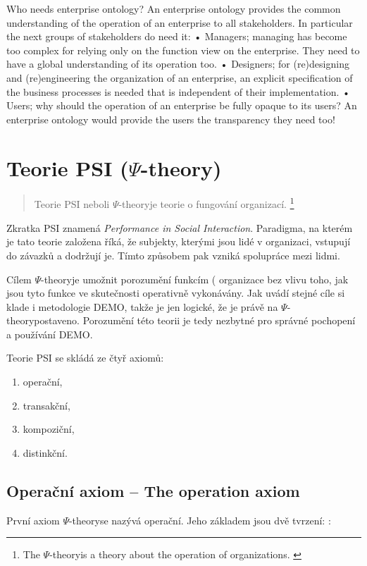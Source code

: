 \documentclass[]{article}
\newcommand{\ptheory}{$\Psi$-theory}
\begin{document}
Who needs enterprise ontology?
An enterprise ontology provides the common understanding of the operation of an enterprise to all stakeholders. In particular the next groups of stakeholders do need it:
• Managers; managing has become too complex for relying only on the function view on the enterprise. They need to have a global understanding of its operation too.
• Designers; for (re)designing and (re)engineering the organization of an enterprise, an explicit specification of the business processes is needed that is independent of their implementation.
• Users; why should the operation of an enterprise be fully opaque to its users? An enterprise ontology would provide the users the transparency they need too!

\section{Teorie PSI ($\Psi$-theory)}

\begin{quote}
Teorie PSI neboli \ptheory  je teorie o fungování organizací. \cite{Dietz2005}
\footnote{The \ptheory is a theory about the operation of organizations. \cite{Dietz2005}}
\end{quote}

Zkratka PSI znamená \textit{Performance in Social Interaction}. Paradigma, na kterém je tato teorie založena říká, že subjekty, kterými jsou lidé v organizaci, vstupují do závazků a dodržují je. Tímto způsobem pak vzniká spolupráce mezi lidmi. %

Cílem \ptheory je umožnit porozumění funkcím (%
organizace bez vlivu toho, jak jsou tyto funkce ve skutečnosti operativně vykonávány. Jak uvádí \cite{Vejrazkova2013} stejné cíle si klade i metodologie DEMO, takže je jen logické, že je právě na \ptheory postaveno. Porozumění této teorii je tedy nezbytné pro správné pochopení a používání DEMO.

Teorie PSI se skládá ze čtyř axiomů:

\begin{enumerate}
\item operační,
\item transakční,
\item kompoziční,
\item distinkční.
\end{enumerate}

\subsection{Operační axiom – The operation axiom}
První axiom \ptheory se nazývá operační. Jeho základem jsou dvě tvrzení: \cite{Dietz2006}:
\end{document}
